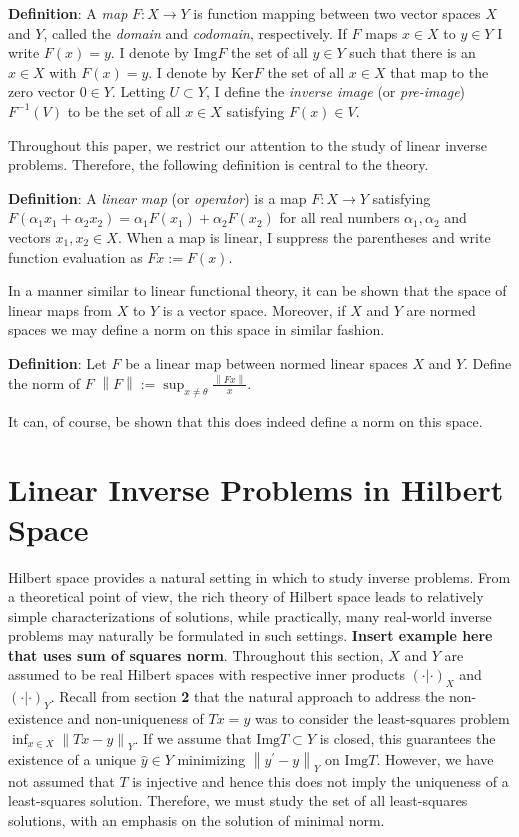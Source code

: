 \documentclass[12pt]{amsart}
\newcommand*{\norm}[1]{\left\lVert#1\right\rVert}
\newcommand{\Img}{\mathrm{Img}}
\newcommand{\Ker}{\mathrm{Ker}}
\begin{document}
 \textbf{Definition}: A \textit{map} $F: X \to Y$ is function mapping between two vector spaces $X$ and $Y$, called the \textit{domain} and \textit{codomain}, respectively. If $F$ maps $x \in X$ to $y \in Y$ I write $F(x) = y$. I denote by $\Img F$ the set of all $y \in Y$ such that there is an $x \in X$ with $F(x) = y$. I denote by $\Ker F$ the set of all $x \in X$ that map to the zero vector $0 \in Y$. Letting $U \subset Y$, I define the \textit{inverse image} (or \textit{pre-image}) $F^{-1}(V)$ to be the set of all $x \in X$ satisfying $F(x) \in V$. 
 
 Throughout this paper, we restrict our attention to the study of linear inverse problems. Therefore, the following definition is central to the theory. 
 
 \textbf{Definition}: A \textit{linear map} (or \textit{operator}) is a map $F: X \to Y$ satisfying $F(\alpha_1x_1 + \alpha_2x_2) = \alpha_1F(x_1) + \alpha_2F(x_2)$ for all real numbers $\alpha_1, \alpha_2$ and vectors $x_1, x_2 \in X$. When a map is linear, I suppress the parentheses and write function evaluation as $Fx := F(x)$. 

In a manner similar to linear functional theory, it can be shown that the space of linear maps from $X$ to $Y$ is a vector space. Moreover, if $X$ and $Y$ are normed spaces we may define a norm on this space in similar fashion. 

\textbf{Definition}: Let $F$ be a linear map between normed linear spaces $X$ and $Y$. Define the norm of $F$ $\norm{F} := \sup_{x \neq \theta} \frac{\norm{Fx}}{x}$. 

It can, of course, be shown that this does indeed define a norm on this space. 


\section{Linear Inverse Problems in Hilbert Space}

Hilbert space provides a natural setting in which to study inverse problems. From a theoretical point of view, the rich theory of Hilbert space leads to relatively simple characterizations of solutions, while practically, many real-world inverse problems may naturally be formulated in such settings. \textbf{Insert example here that uses sum of squares norm}. Throughout this section, $X$ and $Y$ are assumed to be real Hilbert spaces with respective inner products $(\cdot | \cdot)_X$ and $(\cdot | \cdot)_Y$. Recall from section \textbf{2} that the natural approach to address the non-existence and non-uniqueness of $Tx = y$ was to consider the least-squares problem $\inf_{x \in X} \norm{Tx - y}_Y$. If we assume that $\Img T \subset Y$ is closed, this guarantees the existence of a unique $\hat{y} \in Y$ minimizing $\norm{y^\prime - y}_Y$ on $\Img T$. However, we have not assumed that $T$ is injective and hence this does not imply the uniqueness of a least-squares solution. Therefore, we must study the set of all least-squares solutions, with an emphasis on the solution of minimal norm. 
\end{document}
